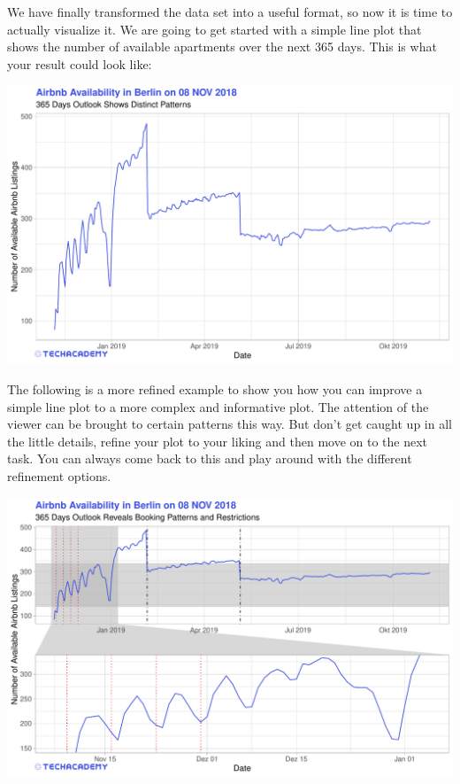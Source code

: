 \documentclass[
  11pt,
]{book}
\begin{document}
We have finally transformed the data set into a useful format, so now it
is time to actually visualize it. We are going to get started with a
simple line plot that shows the number of available apartments over the
next 365 days. This is what your result could look like:

\begin{center}\includegraphics[width=1\linewidth]{plot/1_3_AvailabilityOutlook} \end{center}

The following is a more refined example to show you how you can improve
a simple line plot to a more complex and informative plot. The attention
of the viewer can be brought to certain patterns this way. But don't get
caught up in all the little details, refine your plot to your liking and
then move on to the next task. You can always come back to this and play
around with the different refinement options.

\includegraphics[width=1\linewidth]{plot/1_3_AvailabilityOutlook_advanced}
\end{document}
